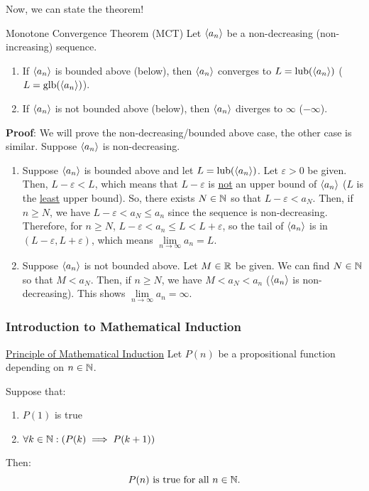 Now, we can state the theorem!
\begin{Theorem}{Monotone Convergence Theorem (MCT)}{}
    Let $ \langle a_n\rangle $ be a non-decreasing (non-increasing) sequence.
    \begin{enumerate}[(1)]
        \item If $ \langle a_n\rangle $ is bounded above (below), then $ \langle a_n\rangle $
              converges to $ L=\mathrm{lub}(\langle a_n\rangle) $ ($ L=\mathrm{glb}(\langle a_n\rangle) $).
        \item If $ \langle a_n\rangle $ is not bounded above (below),
              then $ \langle a_n\rangle $ diverges to $ \infty $ ($ -\infty $).
    \end{enumerate}
    \tcblower{}
    \textbf{Proof}: We will prove the non-decreasing/bounded above case,
    the other case is similar. Suppose $ \langle a_n\rangle $ is non-decreasing.
    \begin{enumerate}[(1)]
        \item Suppose $ \langle a_n\rangle $ is bounded above and let $ L=\mathrm{lub}(\langle a_n\rangle) $.
              Let $ \varepsilon>0 $ be given. Then, $ L-\varepsilon<L $,
              which means that $ L-\varepsilon $ is \underline{not}
              an upper bound of $ \langle a_n\rangle $ ($ L $ is the \underline{least}
              upper bound). So, there exists $ N\in\mathbb{N} $ so that $ L-\varepsilon<a_N $.
              Then, if $ n\ge N $, we have $ L-\varepsilon<a_N\le a_n $
              since the sequence is non-decreasing. Therefore,
              for $ n\ge N $, $ L-\varepsilon<a_n\le L<L+\varepsilon $,
              so the tail of $ \langle a_n\rangle $ is in $ (L-\varepsilon,L+\varepsilon) $,
              which means $ \lim\limits_{{n} \to {\infty}}a_n=L $.
        \item Suppose $ \langle a_n\rangle $ is not bounded above. Let $ M\in\mathbb{R} $
              be given. We can find $ N\in\mathbb{N} $ so that $ M<a_N $. Then, if
              $ n\ge N $, we have $ M<a_N<a_n $ ($ \langle a_n\rangle $ is non-decreasing).
              This shows $ \lim\limits_{{n} \to {\infty}}a_n=\infty $.
    \end{enumerate}
\end{Theorem}
\subsubsection{Introduction to Mathematical Induction}
\begin{Theorem}{\href{https://proofwiki.org/wiki/Principle_of_Mathematical_Induction}{Principle of Mathematical Induction}}{}
    Let $ P(n) $ be a propositional function depending on $ n\in\mathbb{N} $.\smallskip

    Suppose that:
    \begin{enumerate}[(1)]
        \item $ P(1) $ is true
        \item $ \forall k\in\mathbb{N}:(P(k)\implies P(k+1)) $
    \end{enumerate}
    Then:
    \[ \text{$ P(n) $ is true for all $ n\in\mathbb{N} $}. \]
\end{Theorem}

